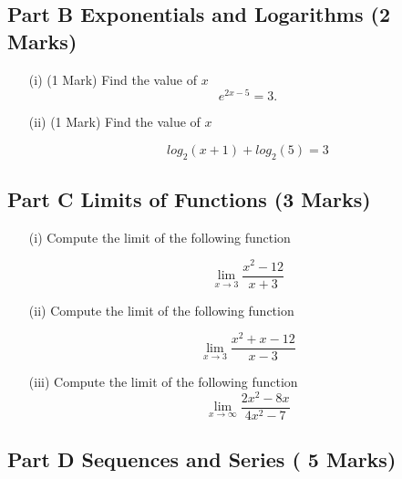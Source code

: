 \documentclass[]{article}
\begin{document}
\subsection*{Part B Exponentials and Logarithms (2 Marks)}

\begin{itemize}
	
	
	\item[(i)] (1 Mark) Find the value of $x$
	\[e^{2x-5} = 3. \]
	
	
	
	\item [(ii)](1 Mark) Find the value of $x$
	
	\[log_2(x + 1) + log_2(5) = 3\]
	
\end{itemize}
\newpage
\subsection*{Part C Limits of Functions (3 Marks)}

\begin{enumerate}
	\item[(i)]  Compute the limit of the following function
	
	\[\lim_{x \to 3 } \frac{x^2-12}{x+3}\]
	
	\item[(ii)]  Compute the limit of the following function
	
	\[\lim_{x \to 3 } \frac{x^2+x-12}{x-3}\]
	
	\item[(iii)]  Compute the limit of the following function
	\[ \lim_{x \to \infty } \frac{2x^2 - 8x }{4x^2 - 7} \]	

\end{enumerate}
\newpage

\subsection*{Part D Sequences and Series ( 5 Marks)}
\end{document}

